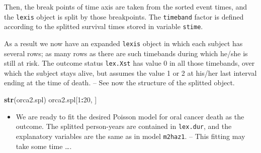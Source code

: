 \documentclass[
]{book}
\newenvironment{Shaded}{\begin{snugshade}}{\end{snugshade}}
\newcommand{\AttributeTok}[1]{\textcolor[rgb]{0.13,0.29,0.53}{#1}}
\newcommand{\DecValTok}[1]{\textcolor[rgb]{0.00,0.00,0.81}{#1}}
\newcommand{\FunctionTok}[1]{\textcolor[rgb]{0.13,0.29,0.53}{\textbf{#1}}}
\newcommand{\NormalTok}[1]{#1}
\newcommand{\OtherTok}[1]{\textcolor[rgb]{0.56,0.35,0.01}{#1}}
\newcommand{\SpecialCharTok}[1]{\textcolor[rgb]{0.81,0.36,0.00}{\textbf{#1}}}
\newcommand{\StringTok}[1]{\textcolor[rgb]{0.31,0.60,0.02}{#1}}
\providecommand{\tightlist}{%
  \setlength{\itemsep}{0pt}\setlength{\parskip}{0pt}}
\begin{document}
Then, the break points of time axis are taken from
the sorted event times, and the \texttt{lexis} object is
split by those breakpoints. The \texttt{timeband} factor
is defined according to the splitted survival times
stored in variable \texttt{stime}.

\begin{Shaded}
\end{Shaded}

As a result we now have an expanded
\texttt{lexis} object in which each subject has several rows;
as many rows as there are such timebands
during which he/she is still at risk.
The outcome status \texttt{lex.Xst} has value 0 in all those
timebands, over which the subject stays alive, but assumes
the value 1 or 2 at his/her last interval ending at the time of death.
-- See now the structure of the splitted object.

\begin{Shaded}
\begin{Highlighting}[]
\FunctionTok{str}\NormalTok{(orca2.spl)}
\NormalTok{orca2.spl[}\DecValTok{1}\SpecialCharTok{:}\DecValTok{20}\NormalTok{, ]}
\end{Highlighting}
\end{Shaded}

\begin{itemize}
\tightlist
\item
  We are ready to fit the desired Poisson model for oral cancer death
  as the outcome. The splitted person-years are contained in \texttt{lex.dur},
  and the explanatory variables are the same as in model \texttt{m2haz1}.
  -- This fitting may take some time \ldots.
\end{itemize}
\end{document}
